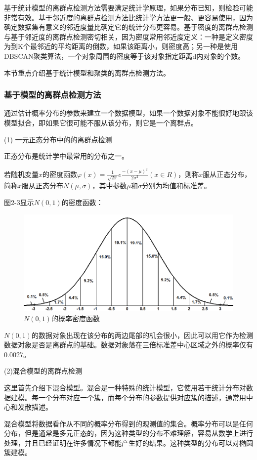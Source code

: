 基于统计模型的离群点检测方法需要满足统计学原理，如果分布已知，则检验可能非常有效。基于邻近度的离群点检测方法比统计学方法更一般、更容易使用，因为确定数据集有意义的邻近度量比确定它的统计分布更容易。基于密度的离群点检测与基于邻近度的离群点检测密切相关，因为密度常用邻近度定义：一种是定义密度为到K个最邻近的平均距离的倒数，如果该距离小，则密度高；另一种是使用DBSCAN聚类算法，一个对象周围的密度等于该对象指定距离d内对象的个数。

本节重点介绍基于统计模型和聚类的离群点检测方法。
\subsubsection{基于模型的离群点检测方法}
通过估计概率分布的参数来建立一个数据模型，如果一个数据对象不能很好地跟该模型拟合，即如果它很可能不服从该分布，则它是一个离群点。


(1) 一元正态分布中的的离群点检测

正态分布是统计学中最常用的分布之一。

若随机变量$x$的密度函数$\varphi(x)=\frac{1}{\sqrt{2\pi}}e\frac{-(x-\mu)^2}{2\sigma^2}(x\in R)$，则称$x$服从正态分布，简称$x$服从正态分布$N(\mu,\sigma)$，其中参数$\mu$和$\sigma$分别为均值和标准差。

图2-3显示$N(0,1)$的密度函数：
\begin{figure}[thbp!]
\centering
\includegraphics[width=0.4\linewidth]{figure/2-6}
\caption{$N(0,1)$的概率密度函数}
\label{fig:2-6}
\end{figure}

$N(0,1)$的数据对象出现在该分布的两边尾部的机会很小，因此可以用它作为检测数据对象是否是离群点的基础。数据对象落在三倍标准差中心区域之外的概率仅有0.0027。

(2)混合模型的离群点检测

这里首先介绍下混合模型。混合是一种特殊的统计模型，它使用若干统计分布对数据建模。每一个分布对应一个簇，而每个分布的参数提供对应簇的描述，通常用中心和发散描述。

混合模型将数据看作从不同的概率分布得到的观测值的集合。概率分布可以是任何分布，但是通常是多元正态的，因为这种类型的分布不难理解，容易从数学上进行处理，并且已经证明在许多情况下都能产生好的结果。这种类型的分布可以对椭圆簇建模。

